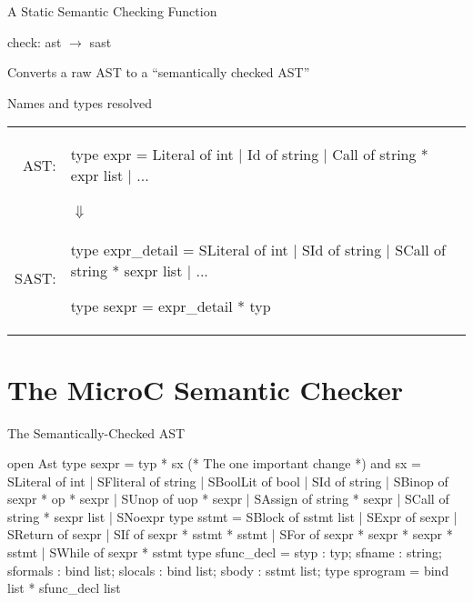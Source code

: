 \documentclass{plt}
\begin{document}
\begin{frame}[fragile]{A Static Semantic Checking Function}

check: ast $\rightarrow$ sast

Converts a raw AST to a ``semantically checked AST''

Names and types resolved

\vspace{10pt}

\begin{center}
\begin{tabular}{rl}
AST: &
\begin{ocaml}
type expr =
   Literal of int
 | Id of string
 | Call of string * expr list
 | ...
\end{ocaml}
\\
&
\hspace{6pc} $\Downarrow$
\vspace{10pt}
\\
SAST: &
\begin{ocaml}
type expr_detail =
  SLiteral of int
| SId of string 
| SCall of string * sexpr list
| ...

type sexpr = expr_detail * typ
\end{ocaml}
\end{tabular}
\end{center}
\end{frame}

\part{The MicroC Semantic Checker}
\frame{\partpage}

\begin{frame}[fragile=singleslide]{The Semantically-Checked AST}
\begin{ocaml}
open Ast
type sexpr = typ * sx    (* The one important change *)
and sx = SLiteral  of int
       | SFliteral of string
       | SBoolLit  of bool
       | SId       of string
       | SBinop    of sexpr * op * sexpr
       | SUnop     of uop * sexpr
       | SAssign   of string * sexpr
       | SCall     of string * sexpr list
       | SNoexpr
type sstmt = SBlock  of sstmt list
           | SExpr   of sexpr
           | SReturn of sexpr
           | SIf     of sexpr * sstmt * sstmt
           | SFor    of sexpr * sexpr * sexpr * sstmt
           | SWhile  of sexpr * sstmt
type sfunc_decl = { styp     : typ;
                    sfname   : string;
                    sformals : bind list;
                    slocals  : bind list;
                    sbody    : sstmt list; }
type sprogram = bind list * sfunc_decl list
\end{ocaml}
\end{frame}
\end{document}
